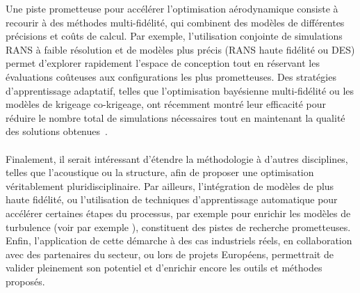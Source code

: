 Une piste prometteuse pour accélérer l'optimisation aérodynamique consiste à recourir à des méthodes multi-fidélité, qui combinent des modèles de différentes précisions et coûts de calcul. Par exemple, l'utilisation conjointe de simulations RANS à faible résolution et de modèles plus précis (RANS haute fidélité ou DES) permet d'explorer rapidement l'espace de conception tout en réservant les évaluations coûteuses aux configurations les plus prometteuses. Des stratégies d'apprentissage adaptatif, telles que l'optimisation bayésienne multi-fidélité ou les modèles de krigeage co-krigeage, ont récemment montré leur efficacité pour réduire le nombre total de simulations nécessaires tout en maintenant la qualité des solutions obtenues~\citep{Perdikaris2017,Peherstorfer2018}.

\paragraph{}
Finalement, il serait intéressant d'étendre la méthodologie à d'autres disciplines, telles que l'acoustique ou la structure, afin de proposer une optimisation véritablement pluridisciplinaire. Par ailleurs, l'intégration de modèles de plus haute fidélité, ou l'utilisation de techniques d'apprentissage automatique pour accélérer certaines étapes du processus, par exemple pour enrichir les modèles de turbulence (voir par exemple \cite{Zhao2020,Beck2021}), constituent des pistes de recherche prometteuses. Enfin, l'application de cette démarche à des cas industriels réels, en collaboration avec des partenaires du secteur, ou lors de projets Européens, permettrait de valider pleinement son potentiel et d'enrichir encore les outils et méthodes proposés.

\printbibliography[heading=subbibintoc]
